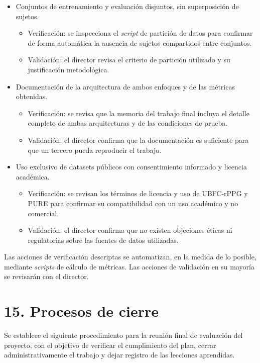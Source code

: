 \documentclass[
11pt, %
]{charter}
\begin{document}
\begin{itemize}
		\item Conjuntos de entrenamiento y evaluación disjuntos, sin superposición de sujetos.
		\begin{itemize}
			\item Verificación: se inspecciona el \textit{script} de partición de datos para confirmar de forma automática la ausencia de sujetos compartidos entre conjuntos.
			\item Validación: el director revisa el criterio de partición utilizado y su justificación metodológica.
		\end{itemize}
		
		\item Documentación de la arquitectura de ambos enfoques y de las métricas obtenidas.
		\begin{itemize}
			\item Verificación: se revisa que la memoria del trabajo final incluya el detalle completo de ambas arquitecturas y de las condiciones de prueba.
			\item Validación: el director confirma que la documentación es suficiente para que un tercero pueda reproducir el trabajo.
		\end{itemize}
		
		\item Uso exclusivo de datasets públicos con consentimiento informado y licencia académica.
		\begin{itemize}
			\item Verificación: se revisan los términos de licencia y uso de UBFC-rPPG y PURE para confirmar su compatibilidad con un uso académico y no comercial.
			\item Validación: el director confirma que no existen objeciones éticas ni regulatorias sobre las fuentes de datos utilizadas.
		\end{itemize}
	\end{itemize}
	
	Las acciones de verificación descriptas se automatizan, en la medida de lo posible, mediante \textit{scripts} de cálculo de métricas. Las acciones de validación en su mayoría se revisarán con el director.
	
	\section{15. Procesos de cierre}    
	\label{sec:cierre}
	
	Se establece el siguiente procedimiento para la reunión final de evaluación del proyecto, con el objetivo de verificar el cumplimiento del plan, cerrar administrativamente el trabajo y dejar registro de las lecciones aprendidas.
	
\end{document}
